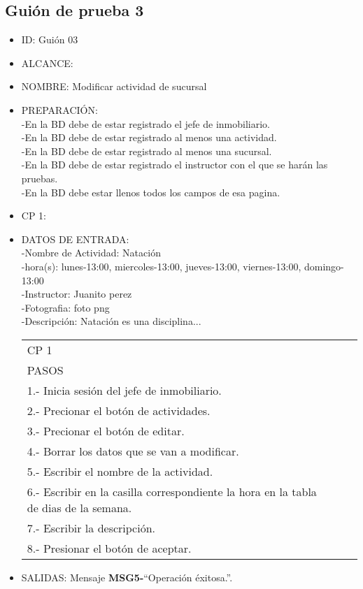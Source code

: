 \subsection{Guión de prueba 3}
\begin{itemize}
	\item ID: Guión 03
	\item ALCANCE: 
	\item NOMBRE: Modificar actividad de sucursal 
	\item PREPARACIÓN:\\
	-En la BD debe de estar registrado el jefe de inmobiliario.\\
	-En la BD debe de estar registrado al menos una actividad.\\
	-En la BD debe de estar registrado al menos una sucursal.\\
	-En la BD debe de estar registrado el instructor con el que se harán las pruebas.\\
	-En la BD debe estar llenos todos los campos de esa pagina.\\
	\item CP 1:
	\item DATOS DE ENTRADA:\\
	-Nombre de Actividad: Natación\\
	-hora(s): lunes-13:00, miercoles-13:00, jueves-13:00, viernes-13:00, domingo-13:00\\
	-Instructor: Juanito perez\\
	-Fotografia: foto png\\
	-Descripción: Natación es una disciplina...
	\begin{center}			
		\begin{tabular}{|l|l|l|l|}
			\hline
			CP 1\\
			PASOS\\
			\hline 1.- Inicia sesión del jefe de inmobiliario.\\
			\hline 2.- Precionar el botón de actividades.\\
			\hline 3.- Precionar el botón de editar.\\
			\hline 4.- Borrar los datos que se van a modificar.\\
			\hline 5.- Escribir el  nombre de la actividad.\\
			\hline 6.- Escribir en la casilla correspondiente la hora en la tabla de dias de la semana.\\
			\hline 7.- Escribir la descripción.\\
			\hline 8.- Presionar el botón de aceptar.\\
			\hline
		\end{tabular}
	\end{center}
	\item SALIDAS: Mensaje {\bf MSG5-}``Operación éxitosa.''.
	

\end{itemize}
